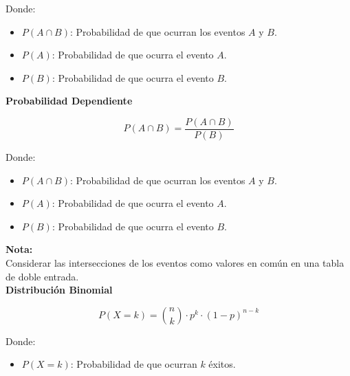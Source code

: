 \documentclass[11pt, a4paper]{article}
\newenvironment{probabilidadIndependiente}{}{}
\newenvironment{probabilidadDependiente}{}{}
\newenvironment{distribucionBinomial}{}{}
\begin{document}
\begin{multicols}{2}
\begin{probabilidadIndependiente}
\begin{center}
            \end{center}
            Donde:
            \begin{itemize}
                \item $P(A \cap B)$: Probabilidad de que ocurran los eventos $A$ y $B$.
                \item $P(A)$: Probabilidad de que ocurra el evento $A$.
                \item $P(B)$: Probabilidad de que ocurra el evento $B$.
            \end{itemize}
        \end{probabilidadIndependiente}
        \begin{probabilidadDependiente}
            \textbf{Probabilidad Dependiente}
            \hrulefill
            \begin{center}
                \begin{equation*}
                    P(A \cap B) = \dfrac{P\left(A \cap B\right)}{P\left(B\right)}
                \end{equation*}
            \end{center}
            Donde:
            \begin{itemize}
                \item $P(A \cap B)$: Probabilidad de que ocurran los eventos $A$ y $B$.
                \item $P(A)$: Probabilidad de que ocurra el evento $A$.
                \item $P(B)$: Probabilidad de que ocurra el evento $B$.
            \end{itemize}
            \textbf{Nota:}\\
            Considerar las intersecciones de los eventos como valores en común en una tabla de doble entrada.\\
        \end{probabilidadDependiente}
        \begin{distribucionBinomial}
            \textbf{Distribución Binomial}
            \hrulefill
            \begin{center}
                \begin{equation*}
                    P(X = k) = \binom{n}{k} \cdot p^k \cdot (1-p)^{n-k}
                \end{equation*}
            \end{center}
            Donde:
            \begin{itemize}
                \item $P(X = k)$: Probabilidad de que ocurran $k$ éxitos.

\end{itemize}
\end{distribucionBinomial}
\end{multicols}
\end{document}
